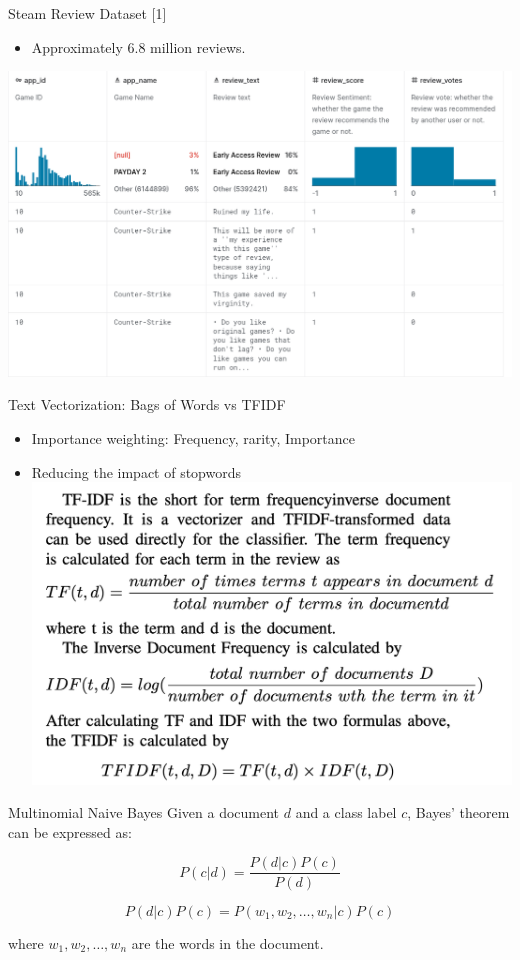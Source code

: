 \documentclass{beamer}
\begin{document}
\begin{frame}{Steam Review Dataset [1]}
\begin{itemize}
\item Approximately 6.8 million reviews.
\end{itemize}
\includegraphics[width = \textwidth]
{img/fig_1.png}
\centering
\end{frame}
 

\begin{frame}{Text Vectorization: Bags of Words vs TFIDF}
\begin{itemize}
\item Importance weighting: Frequency, rarity, Importance
\item Reducing the impact of stopwords 
\includegraphics[width=\textwidth]{img/3.png}
\end{itemize}

\end{frame}

\begin{frame}{Multinomial Naive Bayes}
Given a document $d$ and a class label $c$, Bayes' theorem can be expressed as:

\begin{equation}
P(c|d) = \frac{P(d|c)P(c)}{P(d)}
\end{equation}

\begin{equation}
P(d|c)P(c) = P(w_1, w_2, \dots, w_n|c)P(c)
\end{equation}

where $w_1, w_2, \dots, w_n$ are the words in the document.

\end{frame}
\end{document}
